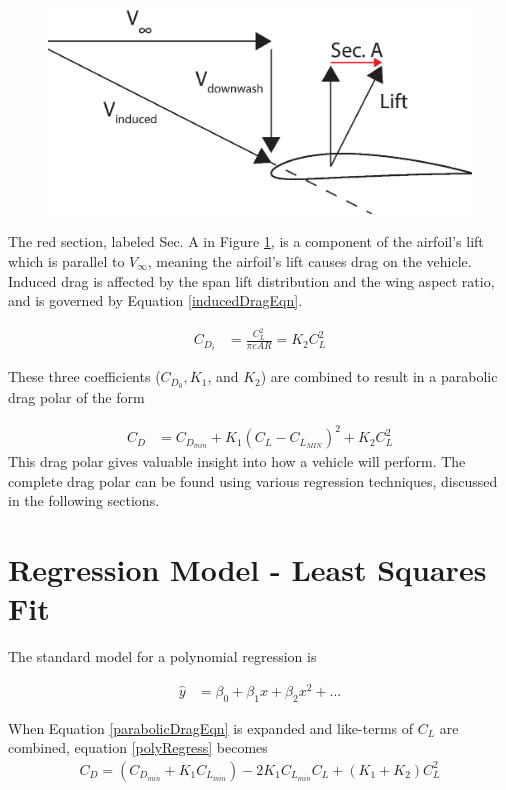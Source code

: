 \begin{figure}[H]
  \centering
  \includegraphics[width=.6\linewidth]{figures/inducedDrag.eps}
  \label{inducedDrag}
\end{figure}

The red section, labeled Sec. A in Figure \ref{inducedDrag}, is a component of the airfoil's lift which is parallel to $V_\infty$, meaning the airfoil's lift causes drag on the vehicle.\\

Induced drag is affected by the span lift distribution and the wing aspect ratio\cite{prandtl1923applications}, and is governed by Equation \ref{inducedDragEqn}.

\begin{align}
\label{inducedDragEqn}
C_{D_i} &= \frac{C^2_L}{\pi e AR} = K_2 C^2_L
\end{align}

These three coefficients ($C_{D_0},K_1$, and $K_2$) are combined to result in a parabolic drag polar of the form 

\begin{align}
\label{parabolicDragEqn}
C_D &= C_{D_{min}} + K_1(C_L-C_{L_{MIN}})^2 + K_2C^2_L
\end{align}
This drag polar gives valuable insight into how a vehicle will perform. The complete drag polar can be found using various regression techniques, discussed in the following sections.

\section{Regression Model - Least Squares Fit}
The standard model for a polynomial regression is

\begin{align}
\label{polyRegress}
\hat{y} &= \beta_0 + \beta_1x + \beta_2x^2+...
\end{align}

When Equation \ref{parabolicDragEqn} is expanded and like-terms of $C_L$ are combined, equation \ref{polyRegress} becomes
\begin{align}
C_D = (C_{D_{min}} + K_1 C_{L_{min}}) -2K_1C_{L_{min}}C_L+(K_1+K_2)C^2_L
\end{align}

